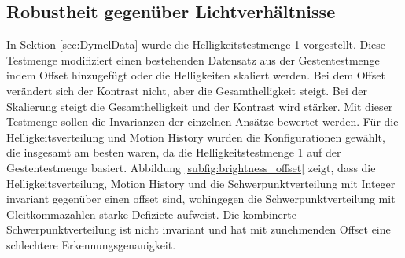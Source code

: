 \subsection{Robustheit gegenüber Lichtverhältnisse}
\label{sec:brightness_eval}
In Sektion \ref{sec:DymelData} wurde die Helligkeitstestmenge 1 vorgestellt. Diese Testmenge modifiziert einen bestehenden Datensatz aus der Gestentestmenge indem Offset hinzugefügt
oder die Helligkeiten skaliert werden. Bei dem Offset verändert sich der Kontrast nicht, aber die Gesamthelligkeit steigt. Bei der Skalierung steigt die Gesamthelligkeit und der Kontrast wird stärker. Mit
dieser Testmenge sollen die Invarianzen der einzelnen Ansätze bewertet werden. Für die Helligkeitsverteilung und Motion History wurden die Konfigurationen gewählt, die insgesamt am besten waren, da die
Helligkeitstestmenge 1 auf der Gestentestmenge basiert.
\newline
\newline
Abbildung \ref{subfig:brightness_offset} zeigt, dass die Helligkeitsverteilung, Motion History und die Schwerpunktverteilung
mit Integer invariant gegenüber einen offset sind, wohingegen die Schwerpunktverteilung mit Gleitkommazahlen starke Defiziete aufweist.
Die kombinerte Schwerpunktverteilung ist nicht invariant und hat mit zunehmenden Offset eine schlechtere Erkennungsgenauigkeit.
